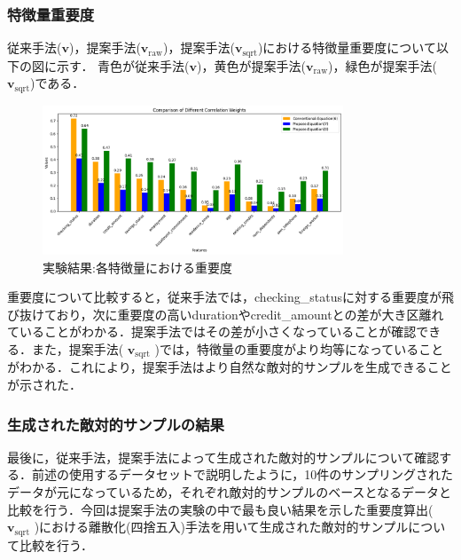 \subsubsection{特徴量重要度}
従来手法($\bm{v}$)，提案手法($\bm{v}_{\mathrm{raw}}$)，提案手法($\bm{v}_{\mathrm{sqrt}}$)における特徴量重要度について以下の図に示す．
青色が従来手法($\bm{v}$)，黄色が提案手法($\bm{v}_{\mathrm{raw}}$)，緑色が提案手法($\bm{v}_{\mathrm{sqrt}}$)である．
\begin{figure}[H]
    \centering
    \includegraphics[width=0.8\textwidth]{images/実験_重要度算出の結果.png}
    \caption{実験結果:各特徴量における重要度}
    \label{fig:adversarial_example}
\end{figure}
重要度について比較すると，従来手法では，checking\_statusに対する重要度が飛び抜けており，次に重要度の高いdurationやcredit\_amountとの差が大き区離れていることがわかる．提案手法ではその差が小さくなっていることが確認できる．また，提案手法( $\bm{v}_{\mathrm{sqrt}}$ )では，特徴量の重要度がより均等になっていることがわかる．これにより，提案手法はより自然な敵対的サンプルを生成できることが示された．

\subsubsection{生成された敵対的サンプルの結果}
最後に，従来手法，提案手法によって生成された敵対的サンプルについて確認する．前述の使用するデータセットで説明したように，10件のサンプリングされたデータが元になっているため，それぞれ敵対的サンプルのベースとなるデータと比較を行う．今回は提案手法の実験の中で最も良い結果を示した重要度算出( $\bm{v}_{\mathrm{sqrt}}$ )における離散化(四捨五入)手法を用いて生成された敵対的サンプルについて比較を行う．

